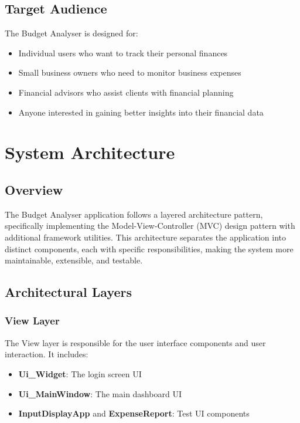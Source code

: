 \documentclass[11pt,a4paper]{report}
\begin{document}
\section{Target Audience}
The Budget Analyser is designed for:
\begin{itemize}
    \item Individual users who want to track their personal finances
    \item Small business owners who need to monitor business expenses
    \item Financial advisors who assist clients with financial planning
    \item Anyone interested in gaining better insights into their financial data
\end{itemize}

\chapter{System Architecture}

\section{Overview}
The Budget Analyser application follows a layered architecture pattern, specifically implementing the Model-View-Controller (MVC) design pattern with additional framework utilities. This architecture separates the application into distinct components, each with specific responsibilities, making the system more maintainable, extensible, and testable.

\section{Architectural Layers}

\subsection{View Layer}
The View layer is responsible for the user interface components and user interaction. It includes:
\begin{itemize}
    \item \textbf{Ui\_Widget}: The login screen UI
    \item \textbf{Ui\_MainWindow}: The main dashboard UI
    \item \textbf{InputDisplayApp} and \textbf{ExpenseReport}: Test UI components
\end{itemize}
\end{document}
